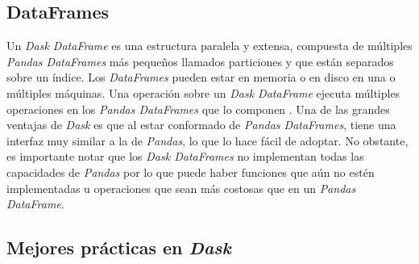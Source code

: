 \subsection{DataFrames}

Un \textit{Dask DataFrame} es una estructura paralela y extensa, compuesta de múltiples \textit{Pandas DataFrames} más pequeños llamados particiones y que están separados sobre un índice. Los \textit{DataFrames} pueden estar en memoria o en disco en una o múltiples máquinas. Una operación sobre un \textit{Dask DataFrame} ejecuta múltiples operaciones en los \textit{Pandas DataFrames} que lo componen \cite{daskdataframe}. Una de las grandes ventajas de \textit{Dask} es que al estar conformado de \textit{Pandas DataFrames}, tiene una interfaz muy similar a la de \textit{Pandas}, lo que lo hace fácil de adoptar. No obstante, es importante notar que los \textit{Dask DataFrames} no implementan todas las capacidades de \textit{Pandas} por lo que puede haber funciones que aún no estén implementadas u operaciones que sean más costosas que en un \textit{Pandas DataFrame}.


\subsection{Mejores prácticas en \textit{Dask}}

